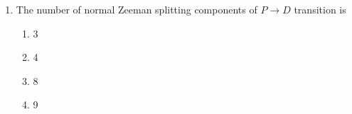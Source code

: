 \documentclass[journal,12pt,onecolumn]{IEEEtran}
\theoremstyle{remark}
\begin{document}
\begin{enumerate}
    \item The number of normal Zeeman splitting components of $P \rightarrow D$ transition is
        \begin{enumerate}
            \item 3
            \item 4
            \item 8
            \item 9
        \end{enumerate}
\end{enumerate}
\end{document}
